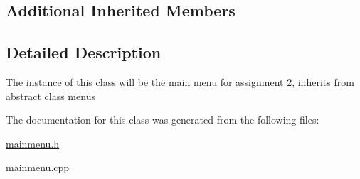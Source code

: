 \subsection*{Additional Inherited Members}


\subsection{Detailed Description}
The instance of this class will be the main menu for assignment 2, inherits from abstract class menus 

The documentation for this class was generated from the following files\+:\begin{DoxyCompactItemize}
\item 
\hyperlink{mainmenu_8h}{mainmenu.\+h}\item 
mainmenu.\+cpp\end{DoxyCompactItemize}
